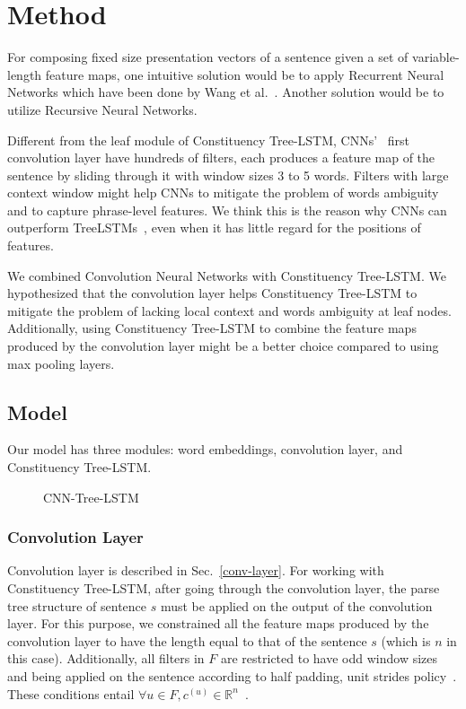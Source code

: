 \section{Method}\label{sec:cnn-treelstm}
For composing fixed size presentation vectors of a sentence given a set of variable-length feature maps, one intuitive solution would be to apply Recurrent Neural Networks which have been done by Wang et al.~\cite{cnn-rnn}.
Another solution would be to utilize Recursive Neural Networks.

Different from the leaf module of Constituency Tree-LSTM, CNNs'~\cite{KimCNN,DCNN,2-layer-cnn} first convolution layer have hundreds of filters, each produces a feature map of the sentence by sliding through it with window sizes 3 to 5 words.
Filters with large context window might help CNNs to mitigate the problem of words ambiguity and to capture phrase-level features.
We think this is the reason why CNNs can outperform TreeLSTMs~\cite{KimCNN}, even when it has little regard for the positions of features. 

We combined Convolution Neural Networks with Constituency Tree-LSTM.
We hypothesized that the convolution layer helps Constituency Tree-LSTM to mitigate the problem of lacking local context and words ambiguity at leaf nodes.
Additionally, using Constituency Tree-LSTM to combine the feature maps produced by the convolution layer might be a better choice compared to using max pooling layers.
\subsection{Model}
Our model has three modules: word embeddings, convolution layer, and Constituency Tree-LSTM.
\begin{figure} [H]
	\centering
	
	\caption[qwerty]{CNN-Tree-LSTM}
\end{figure}
\subsubsection{Convolution Layer}
Convolution layer is described in Sec.~\ref{conv-layer}.
For working with Constituency Tree-LSTM, after going through the convolution layer, the parse tree structure of sentence \(s\) must be applied on the output of the convolution layer. 
For this purpose, we constrained all the feature maps produced by the convolution layer to have the length equal to that of the sentence \(s\) (which is \(n\) in this case).
Additionally, all filters in \(F\) are restricted to have odd window sizes and being applied on the sentence according to half padding, unit strides policy~\cite{conv-arith}.
These conditions entail \({\forall u \in F,  c^{(u)} \in \mathbb{R}^n}\)~\cite{conv-arith}.

